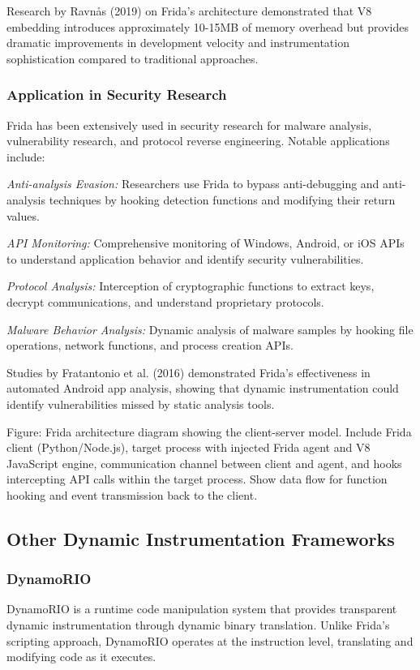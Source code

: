 Research by Ravnås (2019) on Frida's architecture demonstrated that V8 embedding introduces approximately 10-15MB of memory overhead but provides dramatic improvements in development velocity and instrumentation sophistication compared to traditional approaches.

\subsubsection{Application in Security Research}
Frida has been extensively used in security research for malware analysis, vulnerability research, and protocol reverse engineering. Notable applications include:

\textit{Anti-analysis Evasion:} Researchers use Frida to bypass anti-debugging and anti-analysis techniques by hooking detection functions and modifying their return values.

\textit{API Monitoring:} Comprehensive monitoring of Windows, Android, or iOS APIs to understand application behavior and identify security vulnerabilities.

\textit{Protocol Analysis:} Interception of cryptographic functions to extract keys, decrypt communications, and understand proprietary protocols.

\textit{Malware Behavior Analysis:} Dynamic analysis of malware samples by hooking file operations, network functions, and process creation APIs.

Studies by Fratantonio et al. (2016) demonstrated Frida's effectiveness in automated Android app analysis, showing that dynamic instrumentation could identify vulnerabilities missed by static analysis tools.

{{Figure: Frida architecture diagram showing the client-server model. Include Frida client (Python/Node.js), target process with injected Frida agent and V8 JavaScript engine, communication channel between client and agent, and hooks intercepting API calls within the target process. Show data flow for function hooking and event transmission back to the client.}}

\subsection{Other Dynamic Instrumentation Frameworks}

\subsubsection{DynamoRIO}
DynamoRIO is a runtime code manipulation system that provides transparent dynamic instrumentation through dynamic binary translation. Unlike Frida's scripting approach, DynamoRIO operates at the instruction level, translating and modifying code as it executes.

